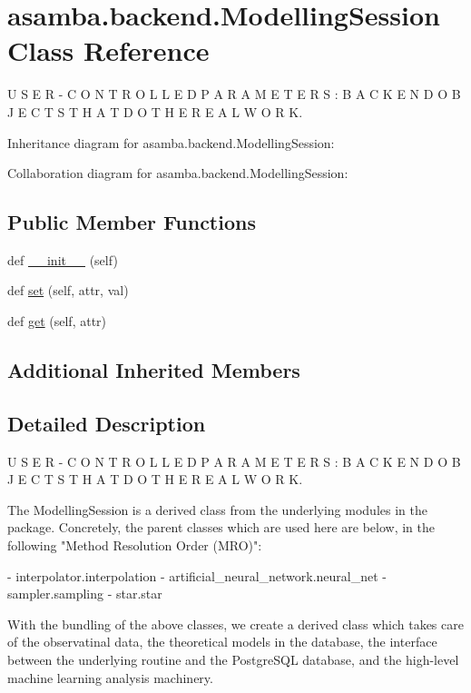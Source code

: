 \hypertarget{classasamba_1_1backend_1_1_modelling_session}{}\section{asamba.\+backend.\+Modelling\+Session Class Reference}
\label{classasamba_1_1backend_1_1_modelling_session}


U S E R -\/ C O N T R O L L E D P A R A M E T E R S \+: B A C K E N D O B J E C T S T H A T D O T H E R E A L W O R K.  




Inheritance diagram for asamba.\+backend.\+Modelling\+Session\+:


Collaboration diagram for asamba.\+backend.\+Modelling\+Session\+:
\subsection*{Public Member Functions}
\begin{DoxyCompactItemize}
\item 
def \hyperlink{classasamba_1_1backend_1_1_modelling_session_a4d7e25887ba7c8af5ae303b2dc63191d}{\+\_\+\+\_\+init\+\_\+\+\_\+} (self)
\item 
def \hyperlink{classasamba_1_1backend_1_1_modelling_session_a83549fd610225e6edea77914b0f65f30}{set} (self, attr, val)
\item 
def \hyperlink{classasamba_1_1backend_1_1_modelling_session_a32588cc6e0b3869d3d5ef688953599d2}{get} (self, attr)
\end{DoxyCompactItemize}
\subsection*{Additional Inherited Members}


\subsection{Detailed Description}
U S E R -\/ C O N T R O L L E D P A R A M E T E R S \+: B A C K E N D O B J E C T S T H A T D O T H E R E A L W O R K. 

\begin{DoxyVerb}The ModellingSession is a derived class from the underlying modules in the package. 
Concretely, the parent classes which are used here are below, in the following "Method
Resolution Order (MRO)":

  - interpolator.interpolation
  - artificial_neural_network.neural_net
  - sampler.sampling
  - star.star

With the bundling of the above classes, we create a derived class which takes care of 
the observatinal data, the theoretical models in the database, the interface between 
the underlying routine and the PostgreSQL database, and the high-level machine learning
analysis machinery.
\end{DoxyVerb}
 

